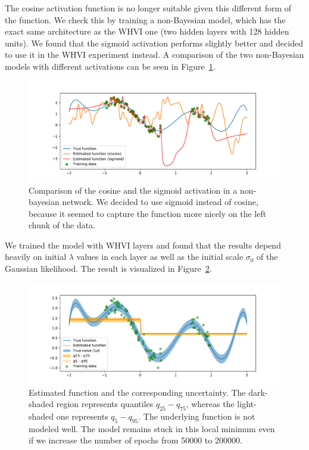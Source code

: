 \documentclass[11pt, twocolumn]{article}
\begin{document}
    The cosine activation function is no longer suitable given this different form of the function.
    We check this by training a non-Bayesian model, which has the exact same architecture as the WHVI one (two hidden layers with 128 hidden units).
    We found that the sigmoid activation performs slightly better and decided to use it in the WHVI experiment instead.
    A comparison of the two non-Bayesian models with different activations can be seen in Figure~\ref{fig:toy-function-non-bayesian}.

    \begin{figure}
        \centering
        \includegraphics[width=1.0\hsize]{img/toy-function-non-bayesian.pdf}
        \caption{Comparison of the cosine and the sigmoid activation in a non-bayesian network.
        We decided to use sigmoid instead of cosine, because it seemed to capture the function more nicely on the left chunk of the data.}
        \label{fig:toy-function-non-bayesian}
    \end{figure}

    We trained the model with WHVI layers and found that the results depend heavily on initial $\lambda$ values in each layer as well as the initial scale $\sigma_0$ of the Gaussian likelihood.
    The result is visualized in Figure~\ref{fig:toy-function-whvi}.
    \begin{figure}
        \centering
        \includegraphics[width=1.0\hsize]{img/bayesian-fit-with-kl.pdf}
        \caption{
        Estimated function and the corresponding uncertainty.
        The dark-shaded region represents quantiles $q_{25}-q_{75}$, whereas the light-shaded one represents $q_{5}-q_{95}$.
        The underlying function is not modeled well.
        The model remains stuck in this local minimum even if we increase the number of epochs from 50000 to 200000.}
        \label{fig:toy-function-whvi}
    \end{figure}
\end{document}
